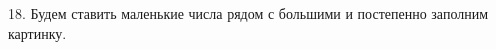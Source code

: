 18. Будем ставить маленькие числа рядом с большими и постепенно заполним картинку.
\begin{center}
\begin{figure}[h!]
\end{figure}
\end{center}
